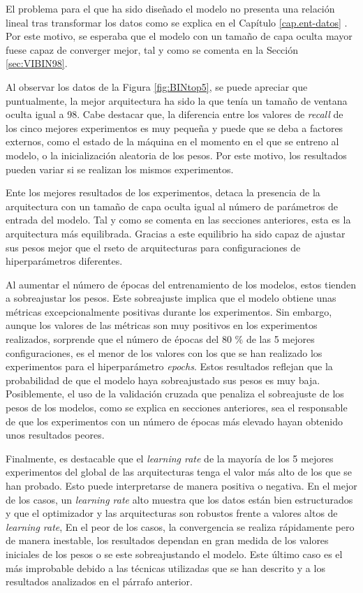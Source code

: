 El problema para el que ha sido diseñado el modelo no presenta una relación lineal tras transformar los datos como se explica en el Capítulo \ref{cap.ent-datos} . Por este motivo, se esperaba que el modelo con un tamaño de capa oculta mayor fuese capaz de converger mejor, tal y como se comenta en la Sección \ref{sec:VIBIN98}.

Al observar los datos de la Figura \ref{fig:BINtop5}, se puede apreciar que puntualmente, la mejor arquitectura ha sido la que tenía un tamaño de ventana oculta igual a 98. Cabe destacar que, la diferencia entre los valores de \textit{recall} de los cinco mejores experimentos es muy pequeña y puede que se deba a factores externos, como el estado de la máquina en el momento en el que se entreno al modelo, o la inicialización aleatoria de los pesos. Por este motivo, los resultados pueden variar si se realizan los mismos experimentos.

Ente los mejores resultados de los experimentos, detaca la presencia de la arquitectura con un tamaño de capa oculta igual al número de parámetros de entrada del modelo. Tal y como se comenta en las secciones anteriores, esta es la arquitectura más equilibrada. Gracias a este equilibrio ha sido capaz de ajustar sus pesos mejor que el rseto de arquitecturas para configuraciones de hiperparámetros diferentes.

Al aumentar el número de épocas del entrenamiento de los modelos, estos tienden a sobreajustar los pesos. Este sobreajuste implica que el modelo obtiene unas métricas excepcionalmente positivas durante los experimentos. Sin embargo, aunque los valores de las métricas son muy positivos en los experimentos realizados, sorprende que el número de épocas del 80 \% de las 5 mejores configuraciones, es el menor de los valores con los que se han realizado los experimentos para el hiperparámetro \textit{epochs}. Estos resultados reflejan que la probabilidad de que el modelo haya sobreajustado sus pesos es muy baja. Posiblemente, el uso de la validación cruzada que penaliza el sobreajuste de los pesos de los modelos, como se explica en secciones anteriores, sea el responsable de que los experimentos con un número de épocas más elevado hayan obtenido unos resultados peores.

Finalmente, es destacable que el \textit{learning rate} de la mayoría de los 5 mejores experimentos del global de las arquitecturas tenga el valor más alto de los que se han probado. Esto puede interpretarse de manera positiva o negativa.
En el mejor de los casos, un \textit{learning rate} alto muestra que los datos están bien estructurados y que el optimizador y las arquitecturas son robustos frente a valores altos de \textit{learning rate},
En el peor de los casos, la convergencia se realiza rápidamente pero de manera inestable, los resultados dependan en gran medida de los valores iniciales de los pesos o se este sobreajustando el modelo. Este último caso es el más improbable debido a las técnicas utilizadas que se han descrito y a los resultados analizados en el párrafo anterior.

